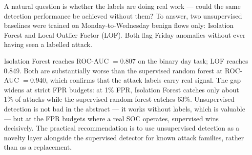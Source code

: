 A natural question is whether the labels are doing real work --- could
the same detection performance be achieved without them? To answer, two
unsupervised baselines were trained on Monday-to-Wednesday benign flows
only: Isolation Forest and Local Outlier Factor (LOF). Both flag Friday
anomalies without ever having seen a labelled attack.

Isolation Forest reaches ROC-AUC $= 0.807$ on the binary day task; LOF
reaches $0.849$. Both are substantially worse than the supervised
random forest at ROC-AUC $= 0.940$, which confirms that the attack
labels carry real signal. The gap widens at strict FPR budgets: at 1\%
FPR, Isolation Forest catches only about 1\% of attacks while the
supervised random forest catches 63\%. Unsupervised detection is not
bad in the abstract --- it works without labels, which is valuable ---
but at the FPR budgets where a real SOC operates, supervised wins
decisively. The practical recommendation is to use unsupervised
detection as a novelty layer alongside the supervised detector for
known attack families, rather than as a replacement.
